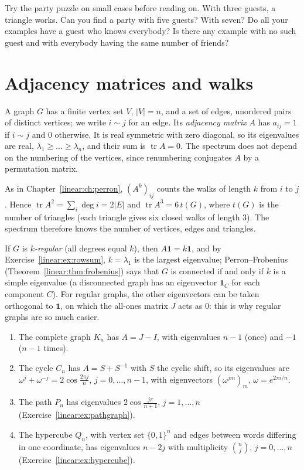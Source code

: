 \begin{think}
Try the party puzzle on small cases before reading on. With three guests, a triangle works. Can you find a party with five
guests? With seven? Do all your examples have a guest who knows everybody? Is there any example with no such guest and with
everybody having the same number of friends?
\end{think}

\section{Adjacency matrices and walks}

A graph $G$ has a finite vertex set $V$, $|V|=n$, and a set of edges, unordered pairs of distinct vertices; we write $i\sim j$ for
an edge. Its \emph{adjacency matrix} $A$ has $a_{ij}=1$ if $i\sim j$ and $0$ otherwise. It is real symmetric with zero diagonal,
so its eigenvalues are real, $\lambda_1\ge\dots\ge\lambda_n$, and their sum is $\operatorname{tr}A=0$. The spectrum does not
depend on the numbering of the vertices, since renumbering conjugates $A$ by a permutation matrix.

As in Chapter~\ref{linear:ch:perron}, $(A^k)_{ij}$ counts the walks of length $k$ from $i$ to $j$. Hence $\operatorname{tr}A^2=\sum_i\deg i
=2|E|$ and $\operatorname{tr}A^3=6\,t(G)$, where $t(G)$ is the number of triangles (each triangle gives six closed walks of length
$3$). The spectrum therefore knows the number of vertices, edges and triangles.

If $G$ is \emph{$k$-regular} (all degrees equal $k$), then $A\mathbf 1=k\mathbf 1$, and by Exercise~\ref{linear:ex:rowsum}, $k=\lambda_1$
is the largest eigenvalue; Perron--Frobenius (Theorem~\ref{linear:thm:frobenius}) says that $G$ is connected if and only if $k$ is a
simple eigenvalue (a disconnected graph has an eigenvector $\mathbf 1_C$ for each component $C$). For regular graphs, the other
eigenvectors can be taken orthogonal to $\mathbf 1$, on which the all-ones matrix $J$ acts as $0$: this is why regular graphs are
so much easier.

\begin{example}\label{linear:exa:spectra}
\begin{enumerate}[label=(\alph*)]
\item The complete graph $K_n$ has $A=J-I$, with eigenvalues $n-1$ (once) and $-1$ ($n-1$ times).
\item The cycle $C_n$ has $A=S+S^{-1}$ with $S$ the cyclic shift, so its eigenvalues are $\omega^j+\omega^{-j}=2\cos\frac{2\pi j}n$,
$j=0,\dots,n-1$, with eigenvectors $(\omega^{jm})_m$, $\omega=e^{2\pi i/n}$.
\item The path $P_n$ has eigenvalues $2\cos\frac{j\pi}{n+1}$, $j=1,\dots,n$ (Exercise~\ref{linear:ex:pathgraph}).
\item The hypercube $Q_n$, with vertex set $\{0,1\}^n$ and edges between words differing in one coordinate, has eigenvalues
$n-2j$ with multiplicity $\binom nj$, $j=0,\dots,n$ (Exercise~\ref{linear:ex:hypercube}).
\end{enumerate}
\end{example}

